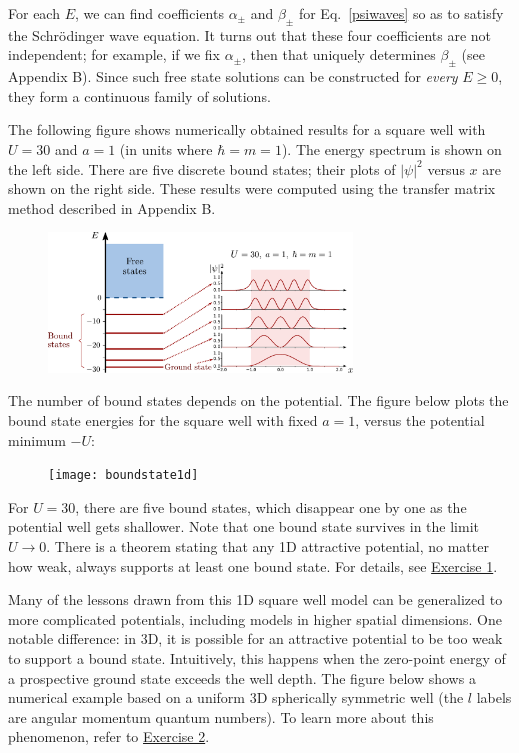 \documentclass[pra,12pt]{revtex4}
\begin{document}
For each $E$, we can find coefficients $\alpha_\pm$ and $\beta_\pm$
for Eq.~\eqref{psiwaves} so as to satisfy the Schr\"odinger wave
equation.  It turns out that these four coefficients are not
independent; for example, if we fix $\alpha_\pm$, then that uniquely
determines $\beta_\pm$ (see Appendix B).  Since such free state
solutions can be constructed for \textit{every} $E \ge 0$, they form a
continuous family of solutions.

The following figure shows numerically obtained results for a square
well with $U = 30$ and $a=1$ (in units where $\hbar = m =1$).  The
energy spectrum is shown on the left side.  There are five discrete
bound states; their plots of $|\psi|^2$ versus $x$ are shown on the
right side.  These results were computed using the transfer matrix
method described in Appendix B.

\begin{figure}[h]
  \centering\includegraphics[width=0.72\textwidth]{boundvsextended}
\end{figure}

The number of bound states depends on the potential.  The figure below
plots the bound state energies for the square well with fixed $a = 1$,
versus the potential minimum $-U$:

\vskip 0.15in
\begin{figure}[h]
  \centering\texttt{[image: boundstate1d]}
\end{figure}

\noindent
For $U = 30$, there are five bound states, which disappear one by one
as the potential well gets shallower.  Note that one bound state
survives in the limit $U \rightarrow 0$.  There is a theorem stating
that any 1D attractive potential, no matter how weak, always supports
at least one bound state.  For details, see
\hyperref[ex:boundstate]{Exercise 1}.

Many of the lessons drawn from this 1D square well model can be
generalized to more complicated potentials, including models in higher
spatial dimensions.  One notable difference: in 3D, it is possible for
an attractive potential to be too weak to support a bound state.
Intuitively, this happens when the zero-point energy of a prospective
ground state exceeds the well depth.  The figure below shows a
numerical example based on a uniform 3D spherically symmetric well
(the $l$ labels are angular momentum quantum numbers).  To learn more
about this phenomenon, refer to \hyperref[ex:boundstate3d]{Exercise
  2}.
\end{document}
